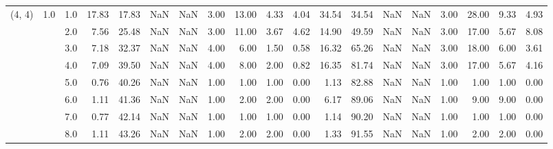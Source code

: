 \begin{tabular}{lllrrrrrrrrrrrrrrrr}
(4, 4) & 1.0 & 1.0  &     17.83 &      17.83 &               NaN &                NaN &  3.00 &  13.00 &             4.33 &                         4.04 &     34.54 &      34.54 &               NaN &                NaN & 3.00 &  28.00 &             9.33 &                         4.93 \\
       &     & 2.0  &      7.56 &      25.48 &               NaN &                NaN &  3.00 &  11.00 &             3.67 &                         4.62 &     14.90 &      49.59 &               NaN &                NaN & 3.00 &  17.00 &             5.67 &                         8.08 \\
       &     & 3.0  &      7.18 &      32.37 &               NaN &                NaN &  4.00 &   6.00 &             1.50 &                         0.58 &     16.32 &      65.26 &               NaN &                NaN & 3.00 &  18.00 &             6.00 &                         3.61 \\
       &     & 4.0  &      7.09 &      39.50 &               NaN &                NaN &  4.00 &   8.00 &             2.00 &                         0.82 &     16.35 &      81.74 &               NaN &                NaN & 3.00 &  17.00 &             5.67 &                         4.16 \\
       &     & 5.0  &      0.76 &      40.26 &               NaN &                NaN &  1.00 &   1.00 &             1.00 &                         0.00 &      1.13 &      82.88 &               NaN &                NaN & 1.00 &   1.00 &             1.00 &                         0.00 \\
       &     & 6.0  &      1.11 &      41.36 &               NaN &                NaN &  1.00 &   2.00 &             2.00 &                         0.00 &      6.17 &      89.06 &               NaN &                NaN & 1.00 &   9.00 &             9.00 &                         0.00 \\
       &     & 7.0  &      0.77 &      42.14 &               NaN &                NaN &  1.00 &   1.00 &             1.00 &                         0.00 &      1.14 &      90.20 &               NaN &                NaN & 1.00 &   1.00 &             1.00 &                         0.00 \\
       &     & 8.0  &      1.11 &      43.26 &               NaN &                NaN &  1.00 &   2.00 &             2.00 &                         0.00 &      1.33 &      91.55 &               NaN &                NaN & 1.00 &   2.00 &             2.00 &                         0.00 \\

\end{tabular}
